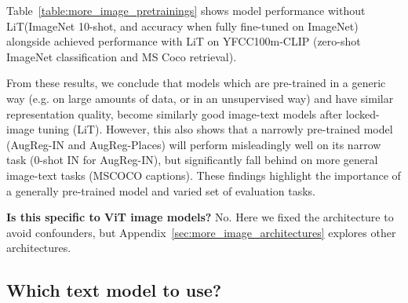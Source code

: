 \documentclass[10pt,twocolumn,letterpaper]{article}
\makeatletter
\def \lit {LiT\xspace}
\renewcommand*{\eg}{e.g.\@\xspace}
\makeatother
\begin{document}
Table~\ref{table:more_image_pretrainings} shows model performance without \lit (ImageNet 10-shot, and accuracy when fully fine-tuned on ImageNet) alongside achieved performance with \lit on YFCC100m-CLIP (zero-shot ImageNet classification and MS Coco retrieval).

From these results, we conclude that models which are pre-trained in a generic way (\eg on large amounts of data, or in an unsupervised way) and have similar representation quality, become similarly good image-text models after locked-image tuning (\lit).
However, this also shows that a narrowly pre-trained model (AugReg-IN and AugReg-Places) will perform misleadingly well on its narrow task (0-shot IN for AugReg-IN), but significantly fall behind on more general image-text tasks (MSCOCO captions).
These findings highlight the importance of a generally pre-trained model and varied set of evaluation tasks.

\textbf{Is this specific to ViT image models?} No. Here we fixed the architecture to avoid confounders, but Appendix~\ref{sec:more_image_architectures} explores other architectures.


\subsection{Which text model to use?}
\label{sec:more_text_models}
\end{document}
